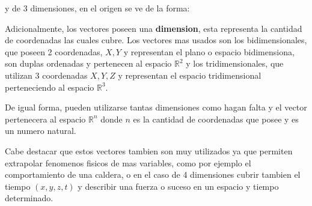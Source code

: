 y de 3 dimensiones, en el origen se ve de la forma:






    Adicionalmente, los vectores poseen una \textbf{dimension}, esta representa
    la cantidad de coordenadas las cuales cubre. Los vectores mas usados son
    los bidimensionales, que poseen 2 coordenadas, $X,Y$ y representan el plano
    o espacio bidimensiona, son duplas ordenadas y pertenecen al espacio
    $\mathbb{R}^2$ y los tridimensionales, que utilizan 3 coordenadas $X,Y,Z$ y
    representan el espacio tridimensional perteneciendo al espacio
    $\mathbb{R}^3$.

    De igual forma, pueden utilizarse tantas dimensiones como hagan falta y el
    vector pertenecera al espacio $\mathbb{R}^n$ donde $n$ es la cantidad de
    coordenadas que posee y es un numero natural.

    Cabe destacar que estos vectores tambien son muy utilizados ya que permiten
    extrapolar fenomenos fisicos de mas variables, como por ejemplo el
    comportamiento de una caldera, o en el caso de 4 dimensiones cubrir tambien
    el tiempo $(x,y,z,t)$ y describir una fuerza o suceso en un espacio y
    tiempo determinado.

